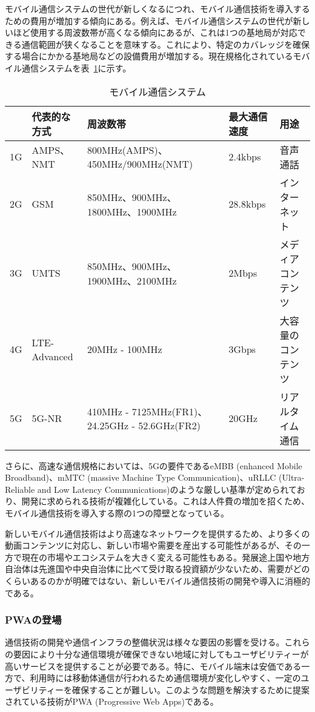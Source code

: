 モバイル通信システムの世代が新しくなるにつれ、モバイル通信技術を導入するための費用が増加する傾向にある。例えば、モバイル通信システムの世代が新しいほど使用する周波数帯が高くなる傾向にあるが、これは1つの基地局が対応できる通信範囲が狭くなることを意味する。これにより、特定のカバレッジを確保する場合にかかる基地局などの設備費用が増加する。現在規格化されているモバイル通信システムを表~\ref{table:モバイル通信システム}に示す。
\begin{table}
    \centering
    \caption{モバイル通信システム}
    \label{table:モバイル通信システム}
    \begin{tabular}{|p{3em}|p{10em}|p{12em}|p{5em}|p{10em}|}
         \hline
         & 代表的な方式 & 周波数帯 & 最大通信速度 & 用途 \\ \hline
         1G & AMPS、NMT & 800MHz(AMPS)、450MHz/900MHz(NMT) & 2.4kbps & 音声通話 \\ \hline
         2G & GSM & 850MHz、900MHz、1800MHz、1900MHz & 28.8kbps & インターネット \\ \hline
         3G & UMTS & 850MHz、900MHz、1900MHz、2100MHz & 2Mbps & メディアコンテンツ \\ \hline
         4G & LTE-Advanced & 20MHz - 100MHz & 3Gbps & 大容量のコンテンツ \\ \hline
         5G & 5G-NR & 410MHz - 7125MHz(FR1)、24.25GHz - 52.6GHz(FR2) & 20GHz & リアルタイム通信 \\ \hline
    \end{tabular}
\end{table}

さらに、高速な通信規格においては、5Gの要件であるeMBB (enhanced Mobile Broadband)、mMTC (massive Machine Type Communication)、uRLLC (Ultra-Reliable and Low Latency Communications)のような厳しい基準が定められており、開発に求められる技術が複雑化している。これは人件費の増加を招くため、モバイル通信技術を導入する際の1つの障壁となっている。

新しいモバイル通信技術はより高速なネットワークを提供するため、より多くの動画コンテンツに対応し、新しい市場や需要を産出する可能性があるが、その一方で現在の市場やエコシステムを大きく変える可能性もある。発展途上国や地方自治体は先進国や中央自治体に比べて受け取る投資額が少ないため、需要がどのくらいあるのかが明確ではない、新しいモバイル通信技術の開発や導入に消極的である。
\subsubsection{PWAの登場}
\label{subsubsection:PWAの登場}
通信技術の開発や通信インフラの整備状況は様々な要因の影響を受ける。これらの要因により十分な通信環境が確保できない地域に対してもユーザビリティーが高いサービスを提供することが必要である。特に、モバイル端末は安価である一方で、利用時には移動体通信が行われるため通信環境が変化しやすく、一定のユーザビリティーを確保することが難しい。このような問題を解決するために提案されている技術がPWA (Progressive Web Apps)である。


